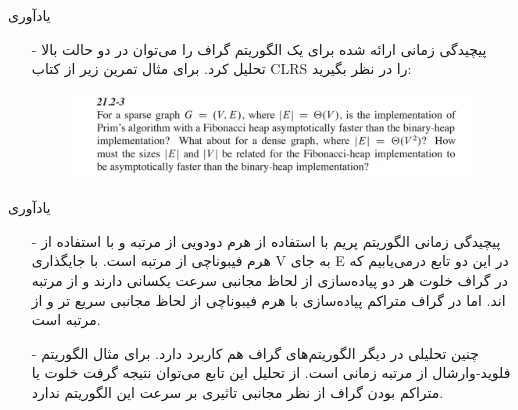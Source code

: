\begin{frame}{يادآوری}
\begin{itemize}\itemr
\item[-]
پیچیدگی زمانی ارائه شده برای یک الگوریتم گراف را می‌توان در دو حالت بالا تحلیل کرد. برای مثال تمرین زیر از کتاب CLRS را در نظر بگیرید:

\begin{figure}[h!]
\centering
\includegraphics[width=\textwidth]{figs/chap01/2.png}
\end{figure}

\end{itemize}
\end{frame}

\begin{frame}{يادآوری}
\begin{itemize}\itemr
\item[-]
پیچیدگی زمانی الگوریتم پریم با استفاده از هرم دودویی از مرتبه
و با استفاده از هرم فیبوناچی از مرتبه
است. با جایگذاری V به جای E در این دو تابع درمی‌یابیم که در گراف خلوت هر دو پیاده‌سازی‌ از لحاظ مجانبی سرعت یکسانی دارند و از مرتبه
اند. اما در گراف متراکم پیاده‌سازی با هرم فیبوناچی از لحاظ مجانبی سریع تر و از مرتبه
 است.
\item[-]
چنین تحلیلی در دیگر الگوریتم‌‌های گراف هم کاربرد دارد. برای مثال الگوریتم فلوید-وارشال از مرتبه زمانی
 است. از تحلیل این تابع می‌توان نتیجه گرفت خلوت یا متراکم بودن گراف از نظر مجانبی تاثیری بر سرعت این الگوریتم ندارد.
\end{itemize}
\end{frame}



